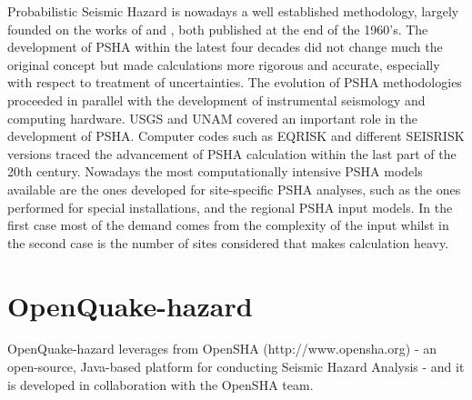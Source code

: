 Probabilistic Seismic Hazard is nowadays a well established methodology, largely founded on the works of \citeauthor{cornell1968} and \citeauthor{esteva1968}, both published at the end of the 1960's. 
%
The development of PSHA within the latest four decades did not change much the original concept but made calculations more rigorous and accurate, especially with respect to treatment of uncertainties. 
%
The evolution of PSHA methodologies proceeded in parallel with the development of instrumental seismology and computing hardware. USGS and UNAM covered an important role in the development of PSHA. Computer codes such as EQRISK \citep{mcguire1976} and different SEISRISK versions \citep{bender1982,bender1987} traced the advancement of PSHA calculation within
the last part of the 20th century.
% 
Nowadays the most computationally intensive PSHA models available are the ones developed for site-specific PSHA analyses, such as the ones performed for special installations, and the regional PSHA input models. In the first case most of the demand comes from the complexity of the input whilst in the second case is the number of sites considered that makes calculation heavy.  
%
\section{OpenQuake-hazard}
OpenQuake-hazard leverages from OpenSHA (http://www.opensha.org) - an open-source, Java-based platform for conducting Seismic Hazard Analysis - and it is developed in collaboration with the OpenSHA team. 